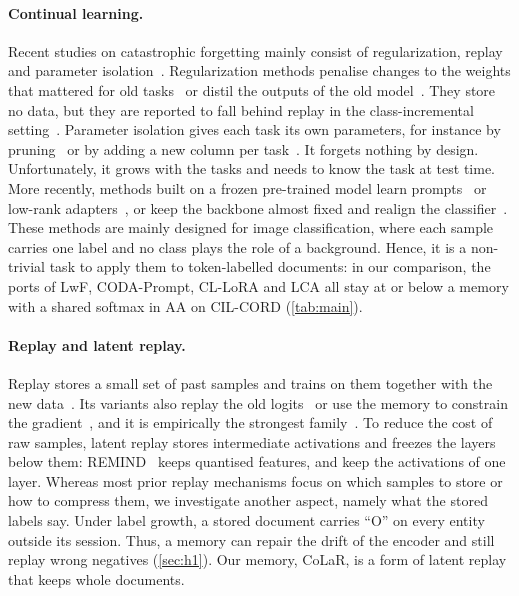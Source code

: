 \documentclass[10pt,twocolumn,letterpaper]{article}
\begin{document}
\paragraph{Continual learning.} Recent studies on catastrophic forgetting mainly consist of regularization, replay and parameter isolation~\citep{wang2024survey}. Regularization methods penalise changes to the weights that mattered for old tasks~\citep{kirkpatrick2017ewc,zenke2017si,aljundi2018mas} or distil the outputs of the old model~\citep{li2017lwf}. They store no data, but they are reported to fall behind replay in the class-incremental setting~\citep{masana2022class}. Parameter isolation gives each task its own parameters, for instance by pruning~\citep{mallya2018packnet} or by adding a new column per task~\citep{rusu2016pnn}. It forgets nothing by design. Unfortunately, it grows with the tasks and needs to know the task at test time. More recently, methods built on a frozen pre-trained model learn prompts~\citep{wang2022l2p,wang2022dualprompt,smith2023coda} or low-rank adapters~\citep{wang2023olora,liang2024inflora,wu2025sdlora,he2025cllora}, or keep the backbone almost fixed and realign the classifier~\citep{zhang2023slca,mcdonnell2023ranpac}. These methods are mainly designed for image classification, where each sample carries one label and no class plays the role of a background. Hence, it is a non-trivial task to apply them to token-labelled documents: in our comparison, the ports of LwF, CODA-Prompt, CL-LoRA and LCA all stay at or below a memory with a shared softmax in AA on CIL-CORD (\cref{tab:main}).

\paragraph{Replay and latent replay.} Replay stores a small set of past samples and trains on them together with the new data~\citep{rolnick2019er,rebuffi2017icarl}. Its variants also replay the old logits~\citep{buzzega2020der} or use the memory to constrain the gradient~\citep{lopezpaz2017gem,chaudhry2019agem}, and it is empirically the strongest family~\citep{masana2022class}. To reduce the cost of raw samples, latent replay stores intermediate activations and freezes the layers below them: REMIND~\citep{hayes2020remind} keeps quantised features, and \citet{pellegrini2020latent} keep the activations of one layer. Whereas most prior replay mechanisms focus on which samples to store or how to compress them, we investigate another aspect, namely what the stored labels say. Under label growth, a stored document carries ``O'' on every entity outside its session. Thus, a memory can repair the drift of the encoder and still replay wrong negatives (\cref{sec:h1}). Our memory, CoLaR, is a form of latent replay that keeps whole documents.
\end{document}
